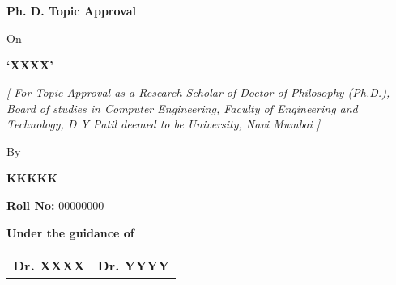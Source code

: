 \chapter*{ }
		
%	
		
		\setlength{\parskip}{1.4em} %
		
		\begin{center}
			{\Large\bfseries Ph. D. Topic Approval}
			
			\vspace{0.5em}
			
			{\normalsize On}
			
			\vspace{0.5em}
			
		{\bfseries `XXXX'}
			
			\vspace{3em}
			
			\parbox{0.9\textwidth}{\centering\itshape
				[ For Topic Approval as a Research Scholar of Doctor of Philosophy (Ph.D.), Board of studies in Computer Engineering, Faculty of Engineering and Technology, D Y Patil deemed to be University, Navi Mumbai ]
			}
			
			\vspace{1em}
			
			{\normalsize By}
			
			
			{\bfseries KKKKK}
			
			
			{\normalsize \textbf{Roll No:} 00000000}
			
			\vspace{2em}
			
			{\bfseries Under the guidance of}
		\end{center}
		
		
		\noindent

		
		\begin{center}
			\begin{tabular}{p{5cm} p{5cm}}
				\centering \bfseries Dr. XXXX & \centering  \bfseries Dr. YYYY\\
			\end{tabular}
		\end{center}
		
